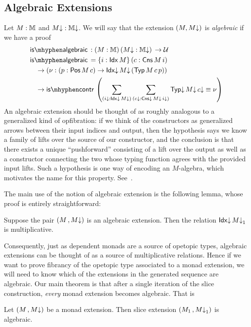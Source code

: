 \subsection{Algebraic Extensions}
\label{sec:algebraic-extensions}

Let $M : \mathbb{M}$ and $M{\downarrow} : \mathbb{M{\downarrow}}$.  We will say that the extension
$(M, M{\downarrow})$ is \emph{algebraic} if we have a proof
\begin{align*}
  &\isalgebraic : (M : \MM)\, (M\da : \MMd)\, \to \UU \\
  &\isalgebraic = \{i : \Idx M\}\, (c : \Cns M\, i) \\
  &\hspace{.3cm} \to (\nu : (p : \Pos M\, c) \to \Idxd M\da\, (\Typ M\, c\, p)) \\
  &\hspace{.3cm} \to \iscontr \left (\sum_{(i\da : \Idxd M\da)} \sum_{(c\da : \Cnsd M\da\, i\da)} \Typd M\da\, c\da \equiv \nu \right )
\end{align*}
An algebraic extension should be thought of as roughly analogous to a
generalized kind of opfibration: if we think of the constructors as
generalized arrows between their input indices and output, then the
hypothesis says we know a family of lifts over the source of our
constructor, and the conclusion is that there exists a unique
``pushforward'' consisting of a lift over the output as well as a
constructor connecting the two whose typing function agrees with the
provided input lifts.  Such a hypothesis is one way of encoding an
$M$-algebra, which motivates the name for this property.
See~\cite[Section 6.3]{leinster2004higher}.

The main use of the notion of algebraic extension is the following
lemma, whose proof is entirely straightforward:
\begin{lem}
  \label{lem:alg-to-fib}
  Suppose the pair $(M \,, M{\downarrow})$ is an algebraic extension.  Then
  the relation $\mathsf{Idx}{\downarrow}\, M{\downarrow}_1$ is multiplicative.
\end{lem}
Consequently, just as dependent monads are a source of opetopic types,
algebraic extensions can be thought of as a source of multiplicative
relations.  Hence if we want to prove fibrancy of the opetopic type
associated to a monad extension, we will need to know which of the
extensions in the generated sequence are algebraic.  Our main theorem
is that after a single iteration of the slice construction,
\emph{every} monad extension becomes algebraic.  That is

\begin{thm}
  \label{thm:slice-alg}
  Let $(M \,, M{\downarrow})$ be a monad extension.  Then slice extension
  $(M_1 \,, M{\downarrow}_1)$ is algebraic.
\end{thm}

